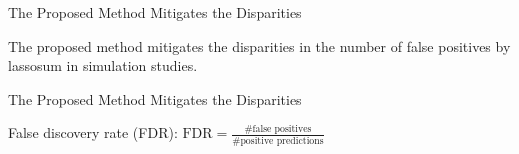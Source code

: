 \documentclass{beamer}
\begin{document}
\begin{frame}{The Proposed Method Mitigates the Disparities}

\begin{figure}[h]	\noindent{}
              \label{fig:Histogram}
\end{figure}

The proposed method mitigates the disparities in the number of false positives by lassosum in simulation studies.
\end{frame}

\begin{frame}{The Proposed Method Mitigates the Disparities}

False discovery rate (FDR): $\text{FDR} =\frac{\text{\# false positives}}{\text{\# positive predictions}}$ 
\begin{figure}[h]	\noindent{}
              \label{fig:FPR and FDR}
\end{figure}
\end{frame}
\end{document}
